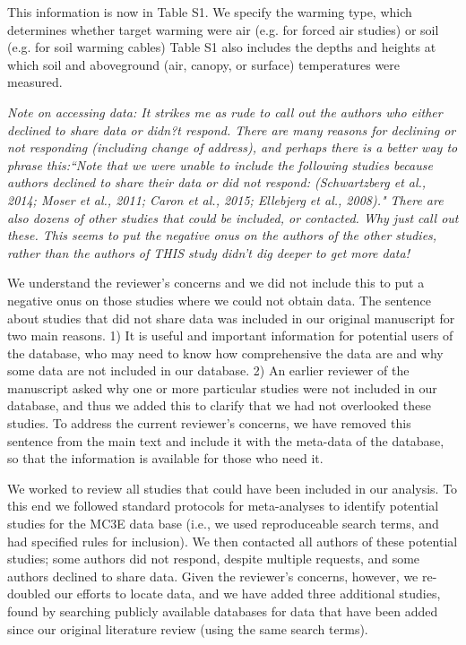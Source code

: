 \documentclass[11pt,a4paper]{letter}
\begin{document}
\begin{letter}{}
\par This information is now in Table S1. We specify the warming type, which determines whether target warming were air (e.g. for forced air studies) or soil (e.g. for soil warming cables) Table S1 also includes the depths and heights at which soil and aboveground (air, canopy, or surface) temperatures were measured. 

\par \emph{Note on accessing data:  It strikes me as rude to call out the authors who either declined to share data or didn?t respond.  There are many reasons for declining or not responding (including change of address), and perhaps there is a better way to phrase this:``Note that we were unable to include the following studies because authors declined to share their data or did not respond: (Schwartzberg et al., 2014; Moser et al., 2011; Caron et al., 2015; Ellebjerg et al., 2008)." There are also dozens of other studies that could be included, or contacted.  Why just call out these.  This seems to put the negative onus on the authors of the other studies, rather than the authors of THIS study didn't dig deeper to get more data!}

\par We understand the reviewer's concerns and we did not include this to put a negative onus on those studies where we could not obtain data.  The sentence about studies that did not share data was included in our original manuscript for two main reasons. 1) It is useful and important information for potential users of the database, who may need to know how comprehensive the data are and why some data are not included in our database. 2) An earlier reviewer of the manuscript asked why one or more particular studies were not included in our database, and thus we added this to clarify that we had not overlooked these studies. To address the current reviewer's concerns, we have removed this sentence from the main text and include it with the meta-data of the database, so that the information is available for those who need it.

\par We worked to review all studies that could have been included in our analysis. To this end we followed standard protocols for meta-analyses to identify potential studies for the MC3E data base (i.e., we used reproduceable search terms, and had specified rules for inclusion). We then contacted all authors of these potential studies; some authors did not respond, despite multiple requests, and some authors declined to share data.  Given the reviewer's concerns, however, we re-doubled our efforts to locate data, and we have added three additional studies, found by searching publicly available databases for data that have been added since our original literature review (using the same search terms). 


\end{letter}
\end{document}
